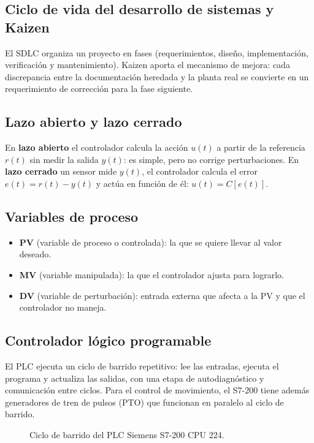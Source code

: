 \documentclass[a4paper,11pt]{article}
\begin{document}
\subsection{Ciclo de vida del desarrollo de sistemas y Kaizen}
El SDLC organiza un proyecto en fases (requerimientos, diseño, implementación, verificación y mantenimiento). Kaizen aporta el mecanismo de mejora: cada discrepancia entre la documentación heredada y la planta real se convierte en un requerimiento de corrección para la fase siguiente.

\subsection{Lazo abierto y lazo cerrado}
En \textbf{lazo abierto} el controlador calcula la acción $u(t)$ a partir de la referencia $r(t)$ sin medir la salida $y(t)$: es simple, pero no corrige perturbaciones. En \textbf{lazo cerrado} un sensor mide $y(t)$, el controlador calcula el error $e(t) = r(t) - y(t)$ y actúa en función de él: $u(t) = C[e(t)]$.

\subsection{Variables de proceso}
\begin{itemize}
\item \textbf{PV} (variable de proceso o controlada): la que se quiere llevar al valor deseado.
\item \textbf{MV} (variable manipulada): la que el controlador ajusta para lograrlo.
\item \textbf{DV} (variable de perturbación): entrada externa que afecta a la PV y que el controlador no maneja.
\end{itemize}

\subsection{Controlador lógico programable}
El PLC ejecuta un ciclo de barrido repetitivo: lee las entradas, ejecuta el programa y actualiza las salidas, con una etapa de autodiagnóstico y comunicación entre ciclos. Para el control de movimiento, el S7-200 tiene además generadores de tren de pulsos (PTO) que funcionan en paralelo al ciclo de barrido.

\begin{figure}[H]\centering
{}
\caption{Ciclo de barrido del PLC Siemens S7-200 CPU 224.}
\end{figure}
\end{document}
